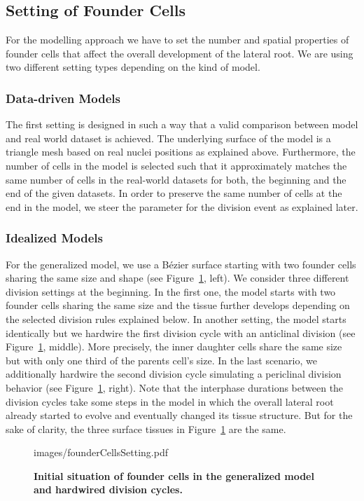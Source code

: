 \documentclass[11pt,a4paper, draft]{article}
\begin{document}
\subsection{Setting of Founder Cells}
\noindent
For the modelling approach we have to set the number and spatial properties of founder cells that affect the overall development of the lateral root. We are using two different setting types depending on the kind of model.

\subsubsection{Data-driven Models}
\noindent
The first setting is designed in such a way that a valid comparison between model and real world dataset is achieved. The underlying surface of the model is a triangle mesh based on real nuclei positions as explained above. Furthermore, the number of cells in the model is selected such that it approximately matches the same number of cells in the real-world datasets for both, the beginning and the end of the given datasets. In order to preserve the same number of cells at the end in the model, we steer the parameter for the division event as explained later.

\subsubsection{Idealized Models}
\noindent
For the generalized model, we use a B\'ezier surface starting with two founder cells sharing the same size and shape (see Figure~\ref{fig:founderCellsSetting}, left). We consider three different division settings at the beginning. In the first one, the model starts with two founder cells sharing the same size and the tissue further develops depending on the selected division rules explained below. In another setting, the model starts identically but we hardwire the first division cycle with an anticlinal division (see Figure~\ref{fig:founderCellsSetting}, middle). More precisely, the inner daughter cells share the same size but with only one third of the parents cell's size. In the last scenario, we additionally hardwire the second division cycle simulating a periclinal division behavior (see Figure~\ref{fig:founderCellsSetting}, right). Note that the interphase durations between the division cycles take some steps in the model in which the overall lateral root already started to evolve and eventually changed its tissue structure. But for the sake of clarity, the three surface tissues in Figure~\ref{fig:founderCellsSetting} are the same.
%
\begin{figure}[htbp]
	\begin{center}
		\begin{overpic}[width=1.\linewidth]{images/founderCellsSetting.pdf}
		\end{overpic}
\caption[Initial situation of founder cells in the generalized model and hardwired division cycles.]
{
{\bf Initial situation of founder cells in the generalized model and hardwired division cycles.}
}
	\label{fig:founderCellsSetting}
	\end{center}
\end{figure}
%
\end{document}
